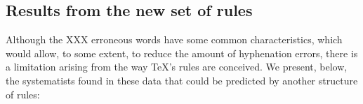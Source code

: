 \documentclass{article}
\begin{document}



\subsection{Results from the new set of rules}
Although the XXX erroneous words have some common characteristics, which would
allow, to some extent, to reduce the amount of hyphenation errors, there is a
limitation arising from the way \TeX{}'s rules are conceived. We present,
below, the systematists found in these data that could be predicted by another
structure of rules:
\end{document}

